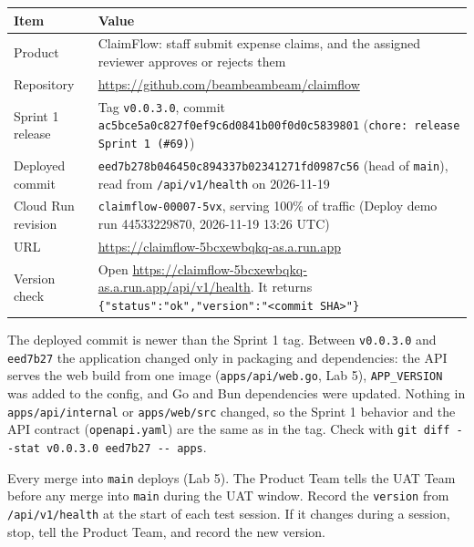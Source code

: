 {\def\LTcaptype{none} %
\begin{longtable}[]{@{}
  >{\raggedright\arraybackslash}p{}
  >{\raggedright\arraybackslash}p{}@{}}
\toprule\noalign{}
\begin{minipage}[b]{\linewidth}\raggedright
Item
\end{minipage} & \begin{minipage}[b]{\linewidth}\raggedright
Value
\end{minipage} \\
\midrule\noalign{}
\endhead
\bottomrule\noalign{}
\endlastfoot
Product & ClaimFlow: staff submit expense claims, and the assigned reviewer approves or rejects them \\
Repository & \url{https://github.com/beambeambeam/claimflow} \\
Sprint 1 release & Tag \texttt{v0.0.3.0}, commit \texttt{ac5bce5a0c827f0ef9c6d0841b00f0d0c5839801} (\texttt{chore: release Sprint 1 (\#69)}) \\
Deployed commit & \texttt{eed7b278b046450c894337b02341271fd0987c56} (head of \texttt{main}), read from \texttt{/api/v1/health} on 2026-11-19 \\
Cloud Run revision & \texttt{claimflow-00007-5vx}, serving 100\% of traffic (Deploy demo run 44533229870, 2026-11-19 13:26 UTC) \\
URL & \url{https://claimflow-5bcxewbqkq-as.a.run.app} \\
Version check & Open \url{https://claimflow-5bcxewbqkq-as.a.run.app/api/v1/health}. It returns \texttt{\{"status":"ok","version":"\textless{}commit\ SHA\textgreater{}"\}} \\
\end{longtable}
}

The deployed commit is newer than the Sprint 1 tag. Between \texttt{v0.0.3.0} and \texttt{eed7b27} the application changed only in packaging and dependencies: the API serves the web build from one image (\texttt{apps/api/web.go}, Lab 5), \texttt{APP\_VERSION} was added to the config, and Go and Bun dependencies were updated. Nothing in \texttt{apps/api/internal} or \texttt{apps/web/src} changed, so the Sprint 1 behavior and the API contract (\texttt{openapi.yaml}) are the same as in the tag. Check with \texttt{git diff -\/-stat v0.0.3.0 eed7b27 -\/- apps}.

Every merge into \texttt{main} deploys (Lab 5). The Product Team tells the UAT Team before any merge into \texttt{main} during the UAT window. Record the \texttt{version} from \texttt{/api/v1/health} at the start of each test session. If it changes during a session, stop, tell the Product Team, and record the new version.

